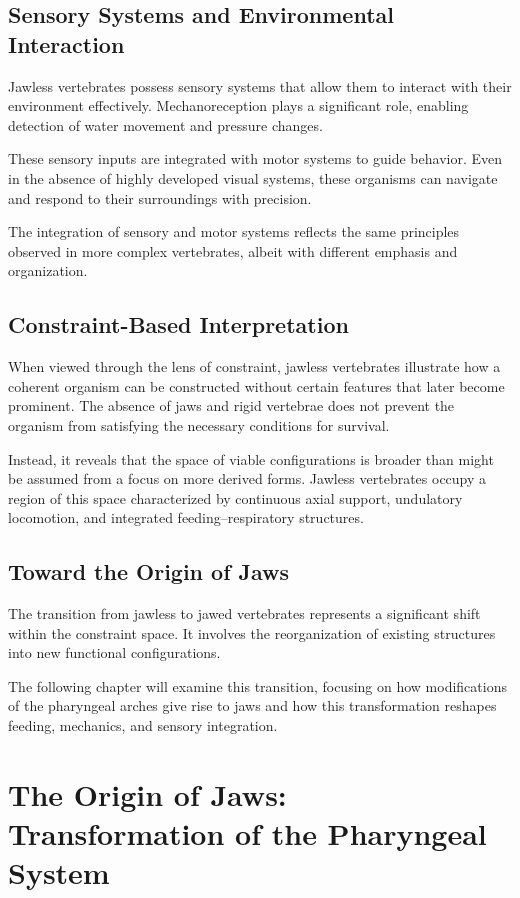 \documentclass[11pt,oneside]{book}
\begin{document}
\section{Sensory Systems and Environmental Interaction}

Jawless vertebrates possess sensory systems that allow them to interact with their environment effectively. Mechanoreception plays a significant role, enabling detection of water movement and pressure changes.

These sensory inputs are integrated with motor systems to guide behavior. Even in the absence of highly developed visual systems, these organisms can navigate and respond to their surroundings with precision.

The integration of sensory and motor systems reflects the same principles observed in more complex vertebrates, albeit with different emphasis and organization.

\section{Constraint-Based Interpretation}

When viewed through the lens of constraint, jawless vertebrates illustrate how a coherent organism can be constructed without certain features that later become prominent. The absence of jaws and rigid vertebrae does not prevent the organism from satisfying the necessary conditions for survival.

Instead, it reveals that the space of viable configurations is broader than might be assumed from a focus on more derived forms. Jawless vertebrates occupy a region of this space characterized by continuous axial support, undulatory locomotion, and integrated feeding–respiratory structures.

\section{Toward the Origin of Jaws}

The transition from jawless to jawed vertebrates represents a significant shift within the constraint space. It involves the reorganization of existing structures into new functional configurations.

The following chapter will examine this transition, focusing on how modifications of the pharyngeal arches give rise to jaws and how this transformation reshapes feeding, mechanics, and sensory integration.

\chapter{The Origin of Jaws: Transformation of the Pharyngeal System}
\end{document}
